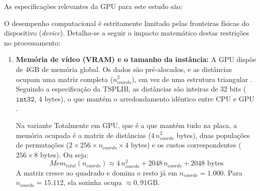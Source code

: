 As especificações relevantes da GPU para este estudo são:

O desempenho computacional é estritamente limitado pelas fronteiras físicas do dispositivo (\emph{device}). Detalha-se a seguir o impacto matemático destas restrições no processamento:

\begin{enumerate}
  \def\labelenumi{\arabic{enumi}.}
  \item
        \textbf{Memória de vídeo (VRAM) e o tamanho da instância:} A GPU dispõe de \(4\text{GB}\) de memória global.
        Os dados são pré-alocados, e as distâncias ocupam uma matriz completa (\(n_{coords}^2\)), em vez de uma estrutura triangular \autocite{harris2007optimizing}.
        Seguindo a especificação da TSPLIB, as distâncias são inteiras de 32 bits (\(\texttt{int32}\), 4 bytes), o que mantém o arredondamento idêntico entre CPU e GPU \autocite{reinelt1991tsplib}.

        Na variante Totalmente em GPU, que é a que mantém tudo na placa, a memória ocupada é a matriz de distâncias (\(4\,n_{coords}^2\) bytes), duas populações de permutações (\(2 \times 256 \times n_{coords} \times 4\) bytes) e os custos correspondentes (\(256 \times 8\) bytes).
        Ou seja:
        \[Mem_{total}(n_{coords}) \approx 4\,n_{coords}^2 + 2048\,n_{coords} + 2048 \text{ bytes}\]
        A matriz cresce ao quadrado e domina o resto já em \(n_{coords} = 1.000\).
        Para \(n_{coords}=15.112\), ela sozinha ocupa \(\approx 0,91 \text{GB}\).


\end{enumerate}
